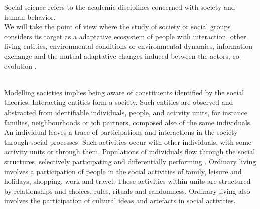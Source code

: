 \documentclass[11pt,oneside,a4paper,openright]{report}
\begin{document}
Social science refers to the academic disciplines concerned with society and human behavior\cite[p.7,chap.3]{MWilliams1999}.
\\
We will take the point of view where the study of society or social groups considers its target as a adaptative ecosystem of people with interaction, other living entities, environmental conditions or environmental dynamics, information exchange and the mutual adaptative changes induced between the actors, co-evolution \cite[p.4]{PerezAndBatten2006}.\\
\\
 
Modelling societies implies being aware of constituents identified by the social theories. Interacting entities form a society. 
Such entities are observed and abstracted from identifiable individuals, people, and activity units, for instance families, 
neighbourhoods or job partners, composed also of the same individuals. An individual leaves a trace of participations and 
interactions in the society through social processes. Such activities occur with other individuals, with some activity units 
or through them. Populations of individuals flow through the social structures, selectively participating and differentially 
performing \cite[p.8]{GordonBurt2010}. 
Ordinary living involves a participation of people in the social activities of family, leisure and holidays, shopping, work and 
travel. These activities within units are structured by relationships and choices, rules, rituals and randomness. Ordinary 
living also involves the participation of cultural ideas and artefacts in social activities.\\
\end{document}
